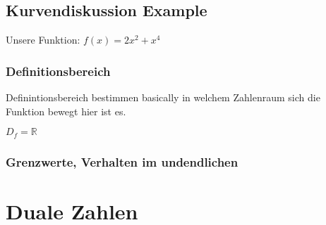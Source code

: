\documentclass{article}
\begin{document}
\subsection{Kurvendiskussion Example}
Unsere Funktion: $f(x)=2x^2+x^4$

\subsubsection{Definitionsbereich}

Definintionsbereich bestimmen basically in welchem Zahlenraum sich die Funktion bewegt
hier ist es.

$D_f=\mathbb{R}$

\subsubsection{Grenzwerte, Verhalten im undendlichen}

\section{Duale Zahlen}
\end{document}
